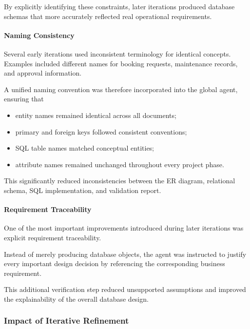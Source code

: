 By explicitly identifying these constraints, later iterations produced database schemas that more accurately reflected real operational requirements.

\paragraph{Naming Consistency}

Several early iterations used inconsistent terminology for identical concepts. Examples included different names for booking requests, maintenance records, and approval information.

A unified naming convention was therefore incorporated into the global agent, ensuring that

\begin{itemize}

	\item entity names remained identical across all documents;

	\item primary and foreign keys followed consistent conventions;

	\item SQL table names matched conceptual entities;

	\item attribute names remained unchanged throughout every project phase.

\end{itemize}

This significantly reduced inconsistencies between the ER diagram, relational schema, SQL implementation, and validation report.

\paragraph{Requirement Traceability}

One of the most important improvements introduced during later iterations was explicit requirement traceability.

Instead of merely producing database objects, the agent was instructed to justify every important design decision by referencing the corresponding business requirement.

This additional verification step reduced unsupported assumptions and improved the explainability of the overall database design.

\subsubsection{Impact of Iterative Refinement}

